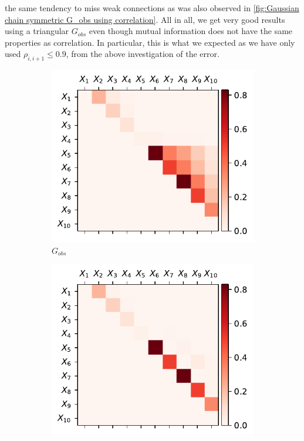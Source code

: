 \documentclass[../Thesis.tex]{subfiles}
\begin{document}
the same tendency to miss weak connections as was also observed in \autoref{fig:Gaussian chain symmetric G_obs using correlation}. All in all, we get very good results using a triangular $G_{obs}$ even though mutual information does not have the same properties as correlation. In particular, this is what we expected as we have only used $\rho_{i,i+1} \leq 0.9$, from the above investigation of the error.
\begin{figure}[H]
    \centering
    \begin{subfigure}[t]{0.49\textwidth}
        \centering
        \includegraphics[width=.95\linewidth]{figures/Gaussian Chain Theoretical/triangular G obs - MI.pdf}
        \caption{$G_{obs}$}
    \end{subfigure}
    \hfill
    \begin{subfigure}[t]{0.49\textwidth}
        \centering
        \includegraphics[width=.95\linewidth]{figures/Gaussian Chain Theoretical/G dir from triangular G obs - MI.pdf}

\end{subfigure}
\end{figure}
\end{document}
